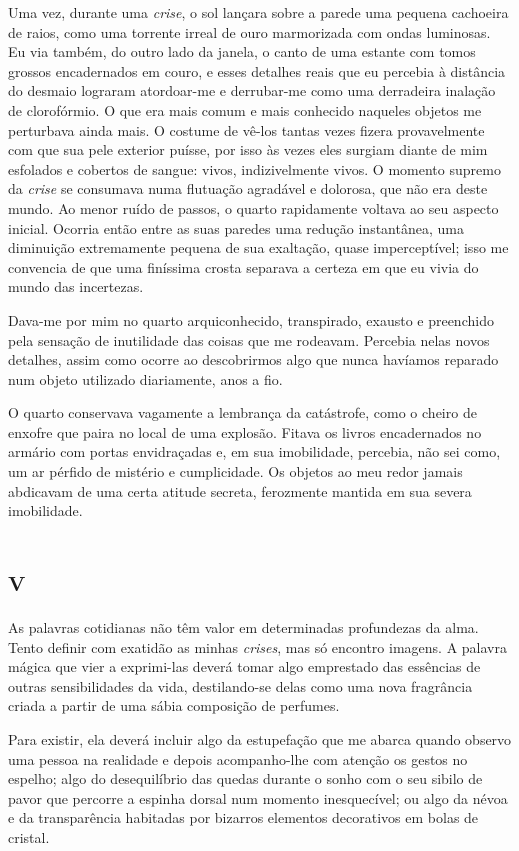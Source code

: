 Uma vez, durante uma \textit{crise}, o sol lançara sobre a parede uma pequena cachoeira de raios, como uma torrente irreal de ouro marmorizada com ondas luminosas. Eu via também, do outro lado da janela, o canto de uma estante com tomos grossos encadernados em couro, e esses detalhes reais que eu percebia à distância do desmaio lograram atordoar-me e derrubar-me como uma derradeira inalação de clorofórmio. O que era mais comum e mais conhecido naqueles objetos me perturbava ainda mais. O costume de vê-los tantas vezes fizera provavelmente com que sua pele exterior puísse, por isso às vezes eles surgiam diante de mim esfolados e cobertos de sangue: vivos, indizivelmente vivos.
O momento supremo da \textit{crise} se consumava numa flutuação agradável e dolorosa, que não era deste mundo. Ao menor ruído de passos, o quarto rapidamente voltava ao seu aspecto inicial. Ocorria então entre as suas paredes uma redução instantânea, uma diminuição extremamente pequena de sua exaltação, quase imperceptível; isso me convencia de que uma finíssima crosta separava a certeza em que eu vivia do mundo das incertezas.

Dava-me por mim no quarto arquiconhecido, transpirado, exausto e preenchido pela sensação de inutilidade das coisas que me rodeavam. Percebia nelas novos detalhes, assim como ocorre ao descobrirmos algo que nunca havíamos reparado num objeto utilizado diariamente, anos a fio.

O quarto conservava vagamente a lembrança da catástrofe, como o cheiro de enxofre que paira no local de uma explosão. Fitava os livros encadernados no armário com portas envidraçadas e, em sua imobilidade, percebia, não sei como, um ar pérfido de mistério e cumplicidade. Os objetos ao meu redor jamais abdicavam de uma certa atitude secreta, ferozmente mantida em sua severa imobilidade.


\chapter*{\huge\centering\textsc{v}}

As palavras cotidianas não têm valor em determinadas profundezas da alma. Tento definir com exatidão as minhas \textit{crises}, mas só encontro imagens. A palavra mágica que vier a exprimi-las deverá tomar algo emprestado das essências de outras sensibilidades da vida, destilando-se delas como uma nova fragrância criada a partir de uma sábia composição de perfumes.

Para existir, ela deverá incluir algo da estupefação que me abarca quando observo uma pessoa na realidade e depois acompanho-lhe com atenção os gestos no espelho; algo do desequilíbrio das quedas durante o sonho com o seu sibilo de pavor que percorre a espinha dorsal num momento inesquecível; ou algo da névoa e da transparência habitadas por bizarros elementos decorativos em bolas de cristal.


